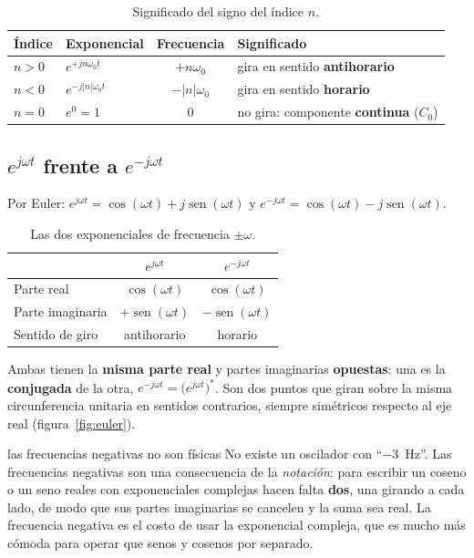 \documentclass[11pt,a4paper]{article}
\DeclareMathOperator{\sen}{sen}
\begin{document}
\begin{table}[H]
\centering
\caption{Significado del signo del índice $n$.}
\renewcommand{\arraystretch}{1.5}
\begin{tabular}{llcl}
\toprule
\textbf{Índice} & \textbf{Exponencial} & \textbf{Frecuencia} & \textbf{Significado}\\
\midrule
$n>0$ & $e^{+jn\omega_0t}$ & $+n\omega_0$ & gira en sentido \textbf{antihorario}\\
$n<0$ & $e^{-j|n|\omega_0t}$ & $-|n|\omega_0$ & gira en sentido \textbf{horario}\\
$n=0$ & $e^{0}=1$ & $0$ & no gira: componente \textbf{continua} ($C_0$)\\
\bottomrule
\end{tabular}
\end{table}

\subsection{\texorpdfstring{$e^{j\omega t}$}{e^(jwt)} frente a \texorpdfstring{$e^{-j\omega t}$}{e^(-jwt)}}
Por Euler: $e^{j\omega t}=\cos(\omega t)+j\sen(\omega t)$ y
$e^{-j\omega t}=\cos(\omega t)-j\sen(\omega t)$.

\begin{table}[H]
\centering
\caption{Las dos exponenciales de frecuencia $\pm\omega$.}
\renewcommand{\arraystretch}{1.5}
\begin{tabular}{lcc}
\toprule
 & $e^{j\omega t}$ & $e^{-j\omega t}$\\
\midrule
Parte real & $\cos(\omega t)$ & $\cos(\omega t)$\\
Parte imaginaria & $+\sen(\omega t)$ & $-\sen(\omega t)$\\
Sentido de giro & antihorario & horario\\
\bottomrule
\end{tabular}
\end{table}

Ambas tienen la \textbf{misma parte real} y partes imaginarias \textbf{opuestas}: una es
la \textbf{conjugada} de la otra, $e^{-j\omega t}=\big(e^{j\omega t}\big)^{*}$. Son dos
puntos que giran sobre la misma circunferencia unitaria en sentidos contrarios, siempre
simétricos respecto al eje real (figura~\ref{fig:euler}).

\begin{notatec}{las frecuencias negativas no son físicas}
No existe un oscilador con ``$-3$~Hz''. Las frecuencias negativas son una consecuencia de
la \emph{notación}: para escribir un coseno o un seno reales con exponenciales complejas
hacen falta \textbf{dos}, una girando a cada lado, de modo que sus partes imaginarias se
cancelen y la suma sea real. La frecuencia negativa es el costo de usar la exponencial
compleja, que es mucho más cómoda para operar que senos y cosenos por separado.
\end{notatec}
\end{document}
